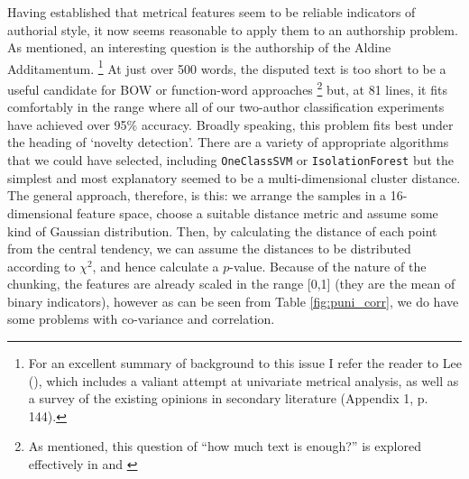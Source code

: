 \documentclass[11pt,a4paper]{scrartcl} %
\begin{document}
{Having established that metrical features seem to be reliable indicators of authorial style, it now seems reasonable to apply them to an authorship problem. As mentioned, an interesting question is the authorship of the Aldine Additamentum.%
\footnote{For an excellent summary of background to this issue I refer the reader to Lee (\citeyear[20-9]{lee_silius_2017}), which includes a valiant attempt at univariate metrical analysis, as well as a survey of the existing opinions in secondary literature (Appendix 1, p. 144).}
At just over 500 words, the disputed text is too short to be a useful candidate for BOW or function-word approaches%
\footnote{As mentioned, this question of ``how much text is enough?'' is explored effectively in \cite{eder_does_2015} and \cite{eder_short_2017}}
but, at 81 lines, it fits comfortably in the range where all of our two-author classification experiments have achieved over 95\% accuracy. Broadly speaking, this problem fits best under the heading of `novelty detection'. There are a variety of appropriate algorithms that we could have selected, including \texttt{OneClassSVM} or \texttt{IsolationForest} but the simplest and most explanatory seemed to be a multi-dimensional cluster distance. The general approach, therefore, is this: we arrange the samples in a 16-dimensional feature space, choose a suitable distance metric and assume some kind of Gaussian distribution. Then, by calculating the distance of each point from the central tendency, we can assume the distances to be distributed according to $\chi^{2}$, and hence calculate a $p$-value. Because of the nature of the chunking, the features are already scaled in the range [0,1] (they are the mean of binary indicators), however as can be seen from Table \ref{fig:puni_corr}, we do have some problems with co-variance and correlation.
\begin{table}
\caption{Some highly correlated features in Silius' \textit{Punica}}
\label{fig:puni_corr}
\phantom{x}
\centering
{}
\end{table}}
\end{document}
